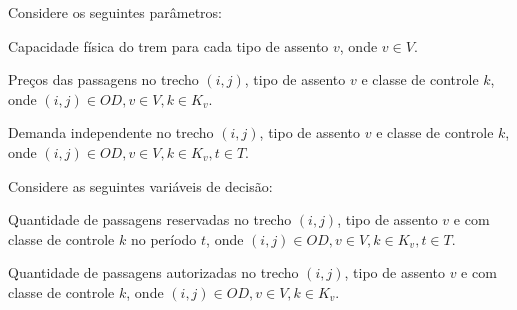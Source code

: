 Considere os seguintes parâmetros:
\begin{description}[style=unboxed, leftmargin=2.5cm, labelindent=1.5cm]
	\setlength{\itemsep}{-2.2em} %
	\setlength{\parskip}{0em} %
	\item[$Q_v:$] Capacidade física do trem para cada tipo de assento $v$, onde $v \in V$. \\
	\item[$P_{ijvk}:$] Preços  das passagens no trecho $(i,j)$, tipo de assento $v$ e classe de controle $k$, onde $(i,j) \in OD,v \in V, k \in K_v$.  \\
	\item[$d_{ijvkt}:$] Demanda independente no trecho $(i,j)$, tipo de assento $v$ e classe de controle $k$, onde $(i,j) \in OD,v \in V, k \in K_v, t \in T$.
\end{description}

Considere as seguintes variáveis de decisão:
\begin{description}[style=unboxed, leftmargin=2.5cm, labelindent=1.5cm]
	\setlength{\itemsep}{-2.2em} %
	\setlength{\parskip}{0em} %
	\item[$X_{ijvkt}:$] Quantidade de passagens reservadas no trecho $(i,j)$, tipo de assento $v$ e com classe de controle $k$ no período $t$, onde $(i,j) \in OD, v \in V, k \in K_v, t \in T$.  \\
	\item[$Y_{ijvk}:$] Quantidade de passagens autorizadas no trecho $(i,j)$, tipo de assento $v$ e com classe de controle $k$, onde $(i,j) \in OD, v \in V, k \in K_v$.
\end{description}


